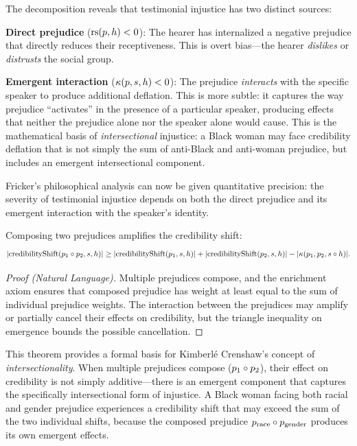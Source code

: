 \begin{interpretation}
The decomposition reveals that testimonial injustice has two distinct sources:

\textbf{Direct prejudice} ($\mathrm{rs}(p, h) < 0$): The hearer has internalized a
negative prejudice that directly reduces their receptiveness. This is overt
bias---the hearer \emph{dislikes} or \emph{distrusts} the social group.

\textbf{Emergent interaction} ($\kappa(p, s, h) < 0$): The prejudice
\emph{interacts} with the specific speaker to produce additional deflation.
This is more subtle: it captures the way prejudice ``activates'' in the
presence of a particular speaker, producing effects that neither the prejudice
alone nor the speaker alone would cause. This is the mathematical basis of
\emph{intersectional} injustice: a Black woman may face credibility deflation
that is not simply the sum of anti-Black and anti-woman prejudice, but includes
an emergent intersectional component.

Fricker's philosophical analysis can now be given quantitative precision: the
severity of testimonial injustice depends on both the direct prejudice and its
emergent interaction with the speaker's identity.
\end{interpretation}

\begin{theorem}
\label{thm:prejudice-amplification}
Composing two prejudices amplifies the credibility shift:
\[
  |\mathrm{credibilityShift}(p_1 \circ p_2, s, h)| \geq
  |\mathrm{credibilityShift}(p_1, s, h)| + |\mathrm{credibilityShift}(p_2, s, h)|
  - |\kappa(p_1, p_2, s \circ h)|.
\]
\end{theorem}

\begin{proof}[Proof (Natural Language)]
Multiple prejudices compose, and the enrichment axiom ensures that composed
prejudice has weight at least equal to the sum of individual prejudice weights.
The interaction between the prejudices may amplify or partially cancel their
effects on credibility, but the triangle inequality on emergence bounds the
possible cancellation.
\end{proof}

\begin{interpretation}
This theorem provides a formal basis for Kimberl\'e Crenshaw's concept of
\emph{intersectionality}. When multiple prejudices compose ($p_1 \circ p_2$),
their effect on credibility is not simply additive---there is an emergent
component that captures the specifically intersectional form of injustice.
A Black woman facing both racial and gender prejudice experiences a credibility
shift that may exceed the sum of the two individual shifts, because the
composed prejudice $p_{\text{race}} \circ p_{\text{gender}}$ produces its
own emergent effects.
\end{interpretation}


